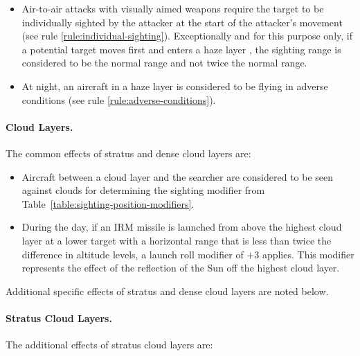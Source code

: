 \begin{advancedrules}
{\begin{itemize}
\item{} Air-to-air attacks with visually aimed weapons require the target to be individually sighted by the attacker at the start of the attacker's movement (see rule \ref{rule:individual-sighting}). Exceptionally and for this purpose only, if a potential target moves first and enters a haze layer , the sighting range is considered to be the normal range and not twice the normal range.

\item{} At night, an aircraft in a haze layer is considered to be flying in adverse conditions (see rule \ref{rule:adverse-conditions}).

\end{itemize}

\paragraph{Cloud Layers.}
\label{rule:common-cloud-layers}

The common effects of stratus and dense cloud layers are:

\begin{itemize}

\item{} Aircraft between a cloud layer and the searcher are considered to be seen against clouds for determining the sighting modifier from Table~\ref{table:sighting-position-modifiers}.

\item{} During the day, if an IRM missile is launched from above the highest cloud layer at a lower target with a horizontal range that is less than twice the difference in altitude levels, a launch roll modifier of $+3$ applies. This modifier represents the effect of the reflection of the Sun off the highest cloud layer.

\end{itemize}

Additional specific effects of stratus and dense cloud layers are noted below.

\paragraph{Stratus Cloud Layers.}
\label{rule:stratus-cloud-layers}

The additional effects of stratus cloud layers are:

}
\end{advancedrules}
